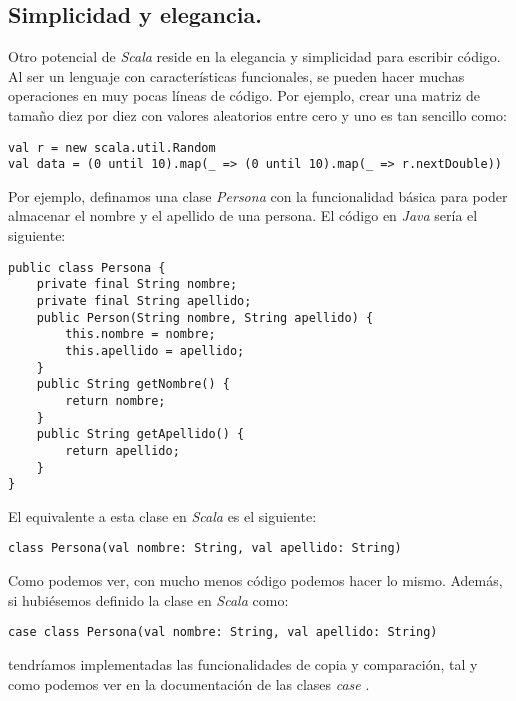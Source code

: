 \subsection{Simplicidad y elegancia.} \label{subsec:simplicidad}

Otro potencial de \textit{Scala} reside en la elegancia y simplicidad para escribir código. Al ser un lenguaje con características funcionales, se pueden hacer muchas operaciones en muy pocas líneas de código. Por ejemplo, crear una matriz de tamaño diez por diez con valores aleatorios entre cero y uno es tan sencillo como:

\begin{lstlisting}[frame=single, basicstyle=\scriptsize, breaklines=true]
val r = new scala.util.Random
val data = (0 until 10).map(_ => (0 until 10).map(_ => r.nextDouble))
\end{lstlisting} 

Por ejemplo, definamos una clase \textit{Persona} con la funcionalidad básica para poder almacenar el nombre y el apellido de una persona. El código en \textit{Java} sería el siguiente: 

\begin{lstlisting}[frame=single, basicstyle=\scriptsize, breaklines=true]
public class Persona {
    private final String nombre;
    private final String apellido;
    public Person(String nombre, String apellido) {
        this.nombre = nombre;
        this.apellido = apellido;
    }
    public String getNombre() {
        return nombre;
    }
    public String getApellido() {
        return apellido;
    }
}
\end{lstlisting} 

El equivalente a esta clase en \textit{Scala} es el siguiente:

\begin{lstlisting}[frame=single, basicstyle=\scriptsize, breaklines=true]
class Persona(val nombre: String, val apellido: String)
\end{lstlisting} 

Como podemos ver, con mucho menos código podemos hacer lo mismo. Además, si hubiésemos definido la clase en \textit{Scala} como:

\begin{lstlisting}[frame=single, basicstyle=\scriptsize, breaklines=true]
case class Persona(val nombre: String, val apellido: String)
\end{lstlisting} 

tendríamos implementadas las funcionalidades de copia y comparación, tal y como podemos ver en la documentación de las clases \textit{case} \cite{scala-cases}.

